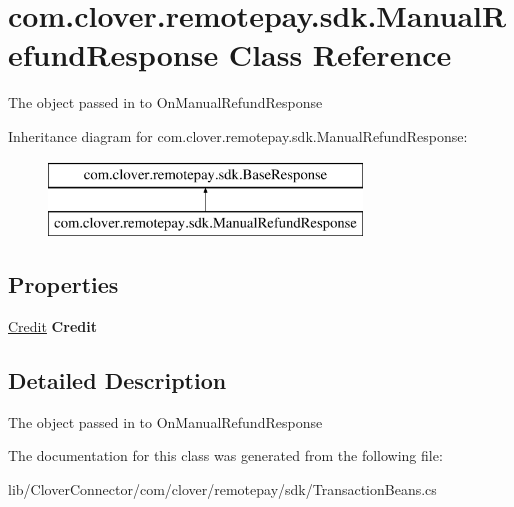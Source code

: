 \hypertarget{classcom_1_1clover_1_1remotepay_1_1sdk_1_1_manual_refund_response}{}\section{com.\+clover.\+remotepay.\+sdk.\+Manual\+Refund\+Response Class Reference}
\label{classcom_1_1clover_1_1remotepay_1_1sdk_1_1_manual_refund_response}


The object passed in to On\+Manual\+Refund\+Response  


Inheritance diagram for com.\+clover.\+remotepay.\+sdk.\+Manual\+Refund\+Response\+:\begin{figure}[H]
\begin{center}
\leavevmode
\includegraphics[height=2.000000cm]{classcom_1_1clover_1_1remotepay_1_1sdk_1_1_manual_refund_response}
\end{center}
\end{figure}
\subsection*{Properties}
\begin{DoxyCompactItemize}
\item 
\mbox{\label{classcom_1_1clover_1_1remotepay_1_1sdk_1_1_manual_refund_response_a2ec27e6342c1beb413b171e22a2d8be0}} 
\hyperlink{classcom_1_1clover_1_1sdk_1_1v3_1_1payments_1_1_credit}{Credit} {\bfseries Credit}
\end{DoxyCompactItemize}


\subsection{Detailed Description}
The object passed in to On\+Manual\+Refund\+Response 



The documentation for this class was generated from the following file\+:\begin{DoxyCompactItemize}
\item 
lib/\+Clover\+Connector/com/clover/remotepay/sdk/Transaction\+Beans.\+cs\end{DoxyCompactItemize}
